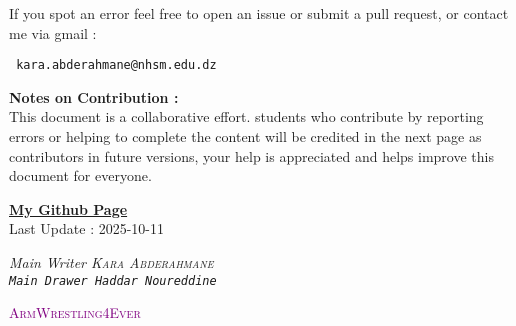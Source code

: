 \documentclass{report}
\begin{document}
\begin{titlepage}
  \begin{center}
    If you spot an error feel free to open an issue or
    submit a pull request, or contact me
    via gmail :
  \end{center}
  \begin{center}
    \normalfont
    \texttt{
      \large kara.abderahmane@nhsm.edu.dz
      \normalfont
    }
  \end{center}
  \noindent \textbf{Notes on Contribution : } \\
  This document is a collaborative effort.
  students who contribute by reporting errors or helping to complete the content
  will be credited in the next page as contributors in future versions,
  your help is appreciated and helps improve this document for everyone.
\end{titlepage}
\begin{titlepage}
  \newpage
  \normalfont
  \vfill
  \begin{center}
    \href{https://github.com/Kapa9102}{\textbf{My Github Page}}\\
    \vspace{0.8cm}
    Last Update : 2025-10-11
  \end{center}
  \begin{tcolorbox}[enhanced, colback=yellow!70!orange!20!white, sharp corners, boxrule=1pt,
    attach boxed title to top center = {yshift = -10pt, xshift = 0pt}, colbacktitle=yellow!30!orange!20!white,
    boxed title style = {boxrule=0pt, arc=4pt}, title=\sc\textcolor{black}{Contributors}]
    \begin{center}
      \it Main Writer \hfill \normalfont  \textsc{Kara Abderahmane}  \\
      \vspace{0.5cm}
      \tt Main Drawer \hfill \normalfont  \tt{Haddar Noureddine}  \\
    \end{center}
  \end{tcolorbox} 
  \vfill
  \begin{center}
   \textsc{\textcolor{purple}{\large ArmWrestling4Ever}}\normalfont
  \end{center}
\end{titlepage}
\tableofcontents




\end{document}
